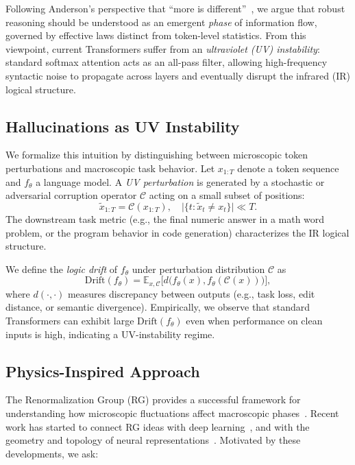 \documentclass{article}
\begin{document}
Following Anderson's perspective that ``more is different''~\cite{anderson1972more}, we argue that robust reasoning should be understood as an emergent \emph{phase} of information flow, governed by effective laws distinct from token-level statistics. From this viewpoint, current Transformers suffer from an \emph{ultraviolet (UV) instability}: standard softmax attention acts as an all-pass filter, allowing high-frequency syntactic noise to propagate across layers and eventually disrupt the infrared (IR) logical structure.

\subsection{Hallucinations as UV Instability}

We formalize this intuition by distinguishing between microscopic token perturbations and macroscopic task behavior. Let $x_{1:T}$ denote a token sequence and $f_\theta$ a language model. A \emph{UV perturbation} is generated by a stochastic or adversarial corruption operator $\mathcal{C}$ acting on a small subset of positions:
\begin{equation}
    \tilde{x}_{1:T} = \mathcal{C}(x_{1:T}), 
    \quad
    \big|\{t : \tilde{x}_t \neq x_t\}\big| \ll T.
\end{equation}
The downstream task metric (e.g., the final numeric answer in a math word problem, or the program behavior in code generation) characterizes the IR logical structure.

We define the \emph{logic drift} of $f_\theta$ under perturbation distribution $\mathcal{C}$ as
\begin{equation}
    \mathrm{Drift}(f_\theta) =
    \mathbb{E}_{x,\mathcal{C}}\big[
        d\big(f_\theta(x), f_\theta(\mathcal{C}(x))\big)
    \big],
    \label{eq:logic-drift}
\end{equation}
where $d(\cdot,\cdot)$ measures discrepancy between outputs (e.g., task loss, edit distance, or semantic divergence). Empirically, we observe that standard Transformers can exhibit large $\mathrm{Drift}(f_\theta)$ even when performance on clean inputs is high, indicating a UV-instability regime.

\subsection{Physics-Inspired Approach}

The Renormalization Group (RG) provides a successful framework for understanding how microscopic fluctuations affect macroscopic phases~\cite{wilson1975renormalization}. Recent work has started to connect RG ideas with deep learning~\cite{mehta2014exact,koch2018mutual,hu2024learning}, and with the geometry and topology of neural representations~\cite{battiloro2024topological,fujimoto2024topological}. Motivated by these developments, we ask:
\end{document}
